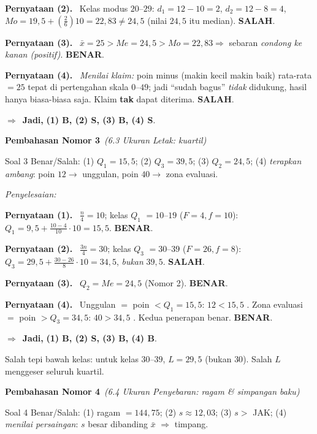 \documentclass[11pt,a4paper]{article}
\newcommand{\jawab}{\par\smallskip\noindent\textit{\textcolor{oranye}{Penyelesaian:}}\par\smallskip}
\newcommand{\jadi}{\par\smallskip\noindent$\Rightarrow$\ \textbf{Jadi, }}
\newcommand{\benar}{\textbf{\textcolor{hijau}{BENAR}}}
\newcommand{\salah}{\textbf{\textcolor{merah}{SALAH}}}
\newcommand{\pernyataan}[1]{\par\smallskip\noindent\textbf{Pernyataan (#1).}\ }
\newcommand{\nomorjudul}[2]{\par\bigskip\noindent%
  {\large\bfseries\color{ungu}Pembahasan Nomor #1}\ {\normalfont\itshape\color{gray}(#2)}\par\nopagebreak\smallskip}
\begin{document}
\pernyataan{2} Kelas modus $20$--$29$: $d_1=12-10=2$, $d_2=12-8=4$,
$Mo=19{,}5+\left(\tfrac{2}{6}\right)10=22{,}83\neq24{,}5$ (nilai $24{,}5$ itu median). \salah.

\pernyataan{3} $\bar{x}=25>Me=24{,}5>Mo=22{,}83\Rightarrow$ sebaran \emph{condong ke
kanan (positif)}. \benar.

\pernyataan{4} \emph{Menilai klaim:} poin minus (makin kecil makin baik) rata-rata
$=25$ tepat di pertengahan skala $0$--$49$; jadi ``sudah bagus'' \emph{tidak}
didukung, hasil hanya biasa-biasa saja. Klaim \textbf{tak} dapat diterima. \salah.

\jadi \textbf{(1) B, (2) S, (3) B, (4) S}.

\nomorjudul{3}{6.3 Ukuran Letak: kuartil}
\begin{soalbox}{Soal 3}
Benar/Salah: (1) $Q_1=15{,}5$; (2) $Q_3=39{,}5$; (3) $Q_2=24{,}5$;
(4) \emph{terapkan ambang}: poin $12\to$ unggulan, poin $40\to$ zona evaluasi.
\end{soalbox}

\jawab
\pernyataan{1} $\tfrac{n}{4}=10$; kelas $Q_1$ $=10$--$19$ ($F=4,f=10$):
$Q_1=9{,}5+\tfrac{10-4}{10}\cdot10=15{,}5$. \benar.

\pernyataan{2} $\tfrac{3n}{4}=30$; kelas $Q_3$ $=30$--$39$ ($F=26,f=8$):
$Q_3=29{,}5+\tfrac{30-26}{8}\cdot10=34{,}5$, \emph{bukan} $39{,}5$. \salah.

\pernyataan{3} $Q_2=Me=24{,}5$ (Nomor 2). \benar.

\pernyataan{4} Unggulan $=$ poin $<Q_1=15{,}5$: $12<15{,}5$ \checkmark. Zona evaluasi
$=$ poin $>Q_3=34{,}5$: $40>34{,}5$ \checkmark. Kedua penerapan benar. \benar.

\jadi \textbf{(1) B, (2) S, (3) B, (4) B}.

\begin{jebakan}
Salah tepi bawah kelas: untuk kelas $30$--$39$, $L=29{,}5$ (bukan $30$). Salah
$L$ menggeser seluruh kuartil.
\end{jebakan}

\nomorjudul{4}{6.4 Ukuran Penyebaran: ragam \& simpangan baku}
\begin{soalbox}{Soal 4}
Benar/Salah: (1) ragam $=144{,}75$; (2) $s\approx12{,}03$; (3) $s>$ JAK;
(4) \emph{menilai persaingan}: $s$ besar dibanding $\bar{x}$ $\Rightarrow$ timpang.
\end{soalbox}
\end{document}
